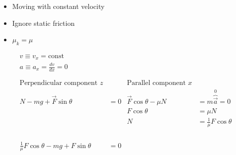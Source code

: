 \documentclass[12pt]{article}
\begin{document}
\begin{itemize}
	\item{Moving with constant velocity}
	\item{Ignore static friction}
	\item{$\mu_k = \mu$}
\end{itemize}
\begin{align*}
	v \equiv v_x = \text{const}                                                                                                                                                       \\
	a \equiv a_x = \frac{dv}{dx} = 0                                                                                                                                                  \\
	\phantom{=}                                                                                                                                                                       \\
	\text{Perpendicular component } z                  &
	                                                   & \text{Parallel component } x                     &                                                                           \\
	N - mg + \overrightarrow{F} \sin{\theta}           & = 0
	                                                   & \overrightarrow{F} \cos{\theta} - \mu N          & = m \overbrace{\overrightarrow{a}}^0 = 0                                  \\
	                                                   &                                                  & F \cos{\theta}                           & = \mu N                        \\
	                                                   &                                                  & N                                        & = \frac{1}{\mu} F \cos{\theta} \\
	\phantom{=}                                                                                                                                                                       \\
	\phantom{=}                                                                                                                                                                       \\
	\frac{1}{\mu} F \cos{\theta} - mg + F \sin{\theta} & = 0                                                                                                                          \\

\end{align*}
\end{document}
